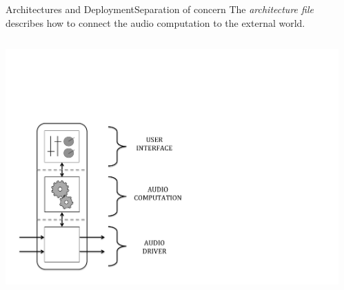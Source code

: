 
\begin{frame}{Architectures and Deployment}{Separation of concern}
The \emph{architecture file} describes how to connect the audio computation to the external world.

\begin{columns}[t]

\begin{column}{0.25\textwidth}
	\begin{center}
 	\includegraphics[height=0.425\textheight]{images/FL-Faust_Construction3}
 	\end{center}

\end{column}
\begin{column}{0.75\textwidth}


\end{column}
\end{columns}
\end{frame}
